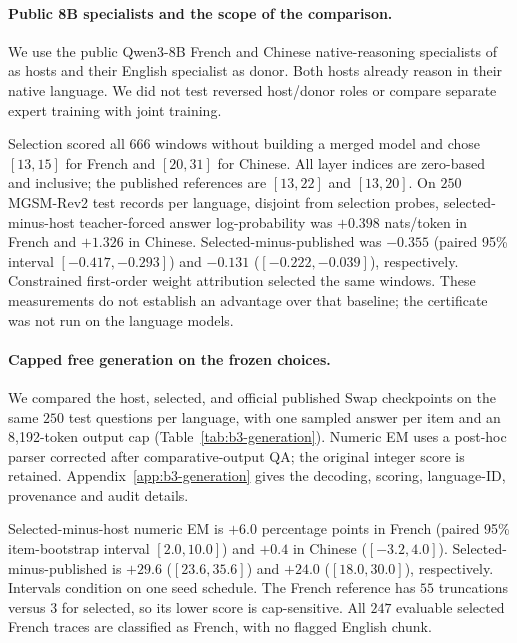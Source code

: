 \documentclass{article}
\theoremstyle{plain}
\theoremstyle{definition}
\theoremstyle{remark}
\begin{document}
\paragraph{Public 8B specialists and the scope of the comparison.}
We use the public Qwen3-8B French and Chinese native-reasoning specialists of
\citet{lasbordes2026rethinking} as hosts and their English specialist as donor.
Both hosts already reason in their native language. We did not test reversed
host/donor roles or compare separate expert training with joint training.

Selection scored all $666$ windows without building a merged model and chose
$[13,15]$ for French and $[20,31]$ for Chinese. All layer indices are zero-based
and inclusive; the published references are $[13,22]$ and $[13,20]$.
On $250$ MGSM-Rev2 test records per language, disjoint from selection probes,
selected-minus-host teacher-forced answer log-probability was $+0.398$
nats/token in French and $+1.326$ in Chinese. Selected-minus-published was
$-0.355$ (paired 95\% interval $[-0.417,-0.293]$) and $-0.131$
($[-0.222,-0.039]$), respectively. Constrained first-order weight attribution selected the
same windows. These measurements do not establish an advantage over that
baseline; the certificate was not run on the language models.

\paragraph{Capped free generation on the frozen choices.}
We compared the host, selected, and official published Swap checkpoints on the
same $250$ test questions per language, with one sampled answer per item and an
8,192-token output cap (Table~\ref{tab:b3-generation}). Numeric EM uses a
post-hoc parser corrected after comparative-output QA; the original integer
score is retained. Appendix~\ref{app:b3-generation} gives the decoding, scoring,
language-ID, provenance and audit details.



Selected-minus-host numeric EM is $+6.0$ percentage points in French (paired
95\% item-bootstrap interval $[2.0,10.0]$) and $+0.4$ in Chinese
($[-3.2,4.0]$). Selected-minus-published is $+29.6$ ($[23.6,35.6]$) and
$+24.0$ ($[18.0,30.0]$), respectively. Intervals condition on one seed
schedule. The French reference has $55$ truncations versus $3$ for selected,
so its lower score is cap-sensitive. All $247$ evaluable selected French traces
are classified as French, with no flagged English chunk.
\end{document}
